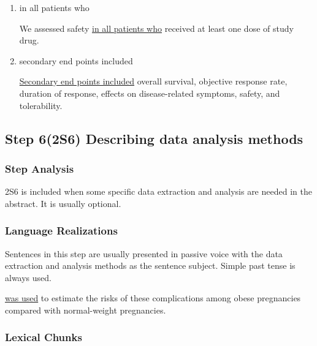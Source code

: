 \documentclass[a4paper]{ctexbook}
\begin{document}
\begin{enumerate}
      \item in all patients who
      \begin{eg}{}
        We assessed safety \uline{in all patients who} received at least one dose of study drug. 
      \end{eg}

      \item secondary end points included
      \begin{eg}{}
        \uline{Secondary end points included} overall survival, objective response rate, duration of response, effects on disease-related symptoms, safety, and tolerability.
      \end{eg}
    \end{enumerate}

  \subsection{Step 6(2S6) Describing data analysis methods}

    \subsubsection{Step Analysis}

    2S6 is included when some specific data extraction and analysis are needed in the abstract. It is usually optional.

    \subsubsection{Language Realizations}

    Sentences in this step are usually presented in passive voice with the data extraction and analysis methods as the sentence subject. Simple past tense is always used.

    \begin{eg}{}
       \uline{was used} to estimate the risks of these complications among obese pregnancies compared with normal-weight pregnancies.    
    \end{eg}

    \subsubsection{Lexical Chunks}
\end{document}
